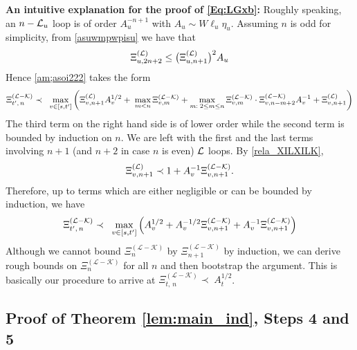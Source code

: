 \documentclass[10pt,reqno]{article}
\theoremstyle{plain} %
\theoremstyle{remark}
\numberwithin{equation}{section}
\begin{document}
\noindent 
{\bf An intuitive explanation for the proof of \eqref{Eq:LGxb}:} 
 Roughly speaking,  an  $n-{\cal L}_u$ loop is of order $A_u^{-n+1}$ with $A_u \sim  W\ell_u\eta_u$. 
 Assuming $n$ is odd for simplicity,  from \eqref{asuwmpwpisu} we  have that
 \begin{equation} 
  \Xi^{({\cal L})}_{u,2n+2} 
\le \big ( \Xi^{({\cal L})}_{u,n+1} \big )^2 A_u 
\end{equation}
Hence    \eqref{am;asoi222} takes the form 
\begin{align} %
 \Xi_{t',\,n }^{(\mathcal{L}-\mathcal{K})}  \prec\;  \; \max_{v\in [s,t']}
  \left(   \Xi^{({\cal L})}_{v,n+1}  A_v^{1/2} +\; \max_{m<n }\Xi^{({\cal L-\cal K})}_{v,m}+\max_{m:\;2\le m\le n }\Xi^{({\cal L-\cal K})}_{v,m}\cdot \Xi^{({\cal L-\cal K})}_{v,n-m+2}A_v^{-1}+\Xi^{({\cal L})}_{v,n+1}\right)
 \end{align}
 The third term on the right hand side is of lower order while the second term is bounded by induction on $n$. We are left with the first and the last terms involving  $n+1$ (and $n+2$ in case $n$ is even) $\cal L$ loops. By \eqref{rela_XILXILK}, 
 \begin{align} 
    \Xi^{(\cal L)}_{v,n+1}\prec 1+A_v^{-1} \Xi^{({\cal L-\cal K})}_{v, n+1}.
\end{align}
Therefore, up to  terms which are either negligible or can  be bounded by induction, we have 
\begin{align} %
 \Xi_{t',\,n }^{(\mathcal{L}-\mathcal{K})}  \prec\;  \; \max_{v\in [s,t']}
  \left(    A_v^{1/2} +A_v^{-1/2} \Xi^{({\cal L-\cal K})}_{v, n+1} +A_v^{-1} \Xi^{({\cal L-\cal K})}_{v, n+1}\right)
\end{align}
Although we cannot bound  $ \Xi_{n }^{(\mathcal{L}-\mathcal{K})}$ by $ \Xi_{n+1 }^{(\mathcal{L}-\mathcal{K})}$ by induction, 
we can derive rough bounds on  $ \Xi_{n }^{(\mathcal{L}-\mathcal{K})}$ for all $n$ and then bootstrap the argument. This is basically our procedure to arrive at $ \Xi_{t,\,n }^{(\mathcal{L}-\mathcal{K})}  \prec \;    A_t^{1/2}$. 



\subsection{Proof of Theorem \ref{lem:main_ind}, Steps 4 and 5}
 
\end{document}
